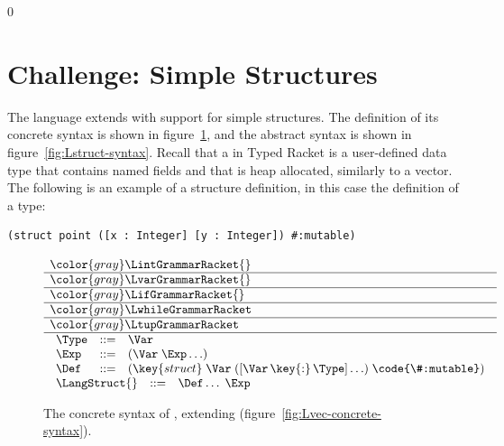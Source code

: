 \documentclass[7x10]{TimesAPriori_MIT}%
\newcommand{\gray}[1]{{\color{gray} #1}}
\def\racketEd{0}
\def\edition{1}
\numberwithin{theorem}{chapter}
\numberwithin{definition}{chapter}
\numberwithin{equation}{chapter}
\begin{document}
{\if\edition\racketEd
\section{Challenge: Simple Structures}
\label{sec:simple-structures}

The language \LangStruct{} extends \LangVec{} with support for simple
structures. The definition of its concrete syntax is shown in
figure~\ref{fig:Lstruct-concrete-syntax}, and the abstract syntax is
shown in figure~\ref{fig:Lstruct-syntax}. Recall that a 
in Typed Racket is a user-defined data type that contains named fields
and that is heap allocated,
similarly to a vector. The following is an
example of a structure definition, in this case the definition of a
 type:
\begin{lstlisting}
(struct point ([x : Integer] [y : Integer]) #:mutable)
\end{lstlisting}

\newcommand{\LstructGrammarRacket}{
\begin{array}{lcl}
  \Type &::=& \Var \\
  \Exp &::=& (\Var\;\Exp \ldots)\\
  \Def &::=& (\key{struct}\; \Var \; ([\Var \,\key{:}\, \Type] \ldots)\; \code{\#:mutable})\\
\end{array}
}
\newcommand{\LstructASTRacket}{
\begin{array}{lcl}
  \Type &::=& \VAR{\Var} \\
  \Exp &::=& \APPLY{\Var}{\Exp\ldots} \\
  \Def &::=& \LP\key{StructDef}\; \Var \; \LP\LS\Var \,\key{:}\, \Type\RS \ldots\RP\RP 
\end{array}
}

\begin{figure}[tbp]
\centering
\begin{tcolorbox}[colback=white]
\[
\begin{array}{l}
  \gray{\LintGrammarRacket{}} \\ \hline
  \gray{\LvarGrammarRacket{}} \\ \hline
  \gray{\LifGrammarRacket{}} \\ \hline
  \gray{\LwhileGrammarRacket} \\ \hline
  \gray{\LtupGrammarRacket} \\  \hline
  \LstructGrammarRacket \\
\begin{array}{lcl}
  \LangStruct{} &::=& \Def \ldots \; \Exp
\end{array}
\end{array}
\]
\end{tcolorbox}
\caption{The concrete syntax of \LangStruct{}, extending \LangVec{}
  (figure~\ref{fig:Lvec-concrete-syntax}).}
\label{fig:Lstruct-concrete-syntax}
\end{figure}

}
\end{document}
